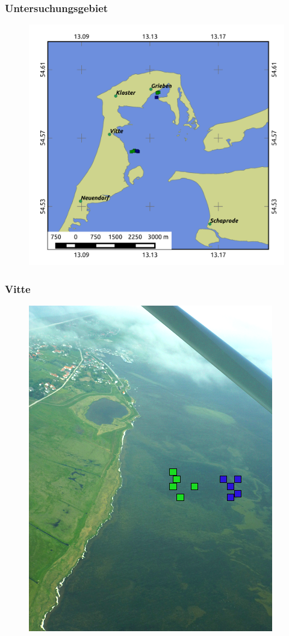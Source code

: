 \documentclass{beamer}
\begin{document}
\begin{frame}
\frametitle{Untersuchungsgebiet}
\begin{figure}
\includegraphics[height=0.8\textheight]{images/Hiddensee.png}
\end{figure}
\end{frame}

\begin{frame}
\frametitle{Vitte}
\begin{figure}
\includegraphics[height=0.8\textheight]{images/Fotos/vitte.png}
\end{figure}
\end{frame}
\end{document}

